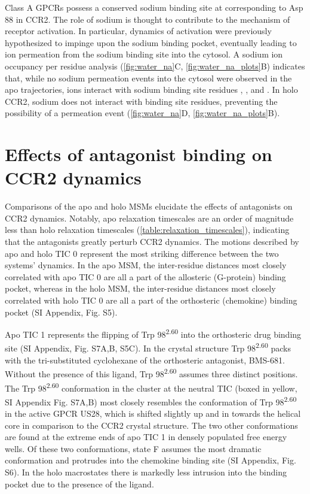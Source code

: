 Class A GPCRs possess a conserved sodium binding site at  corresponding to Asp 88 in CCR2\cite{Katritch2014}.
The role of sodium is thought to contribute to the mechanism of receptor activation\cite{Yuan2013,Vickery2018,Miao2015}. In particular, dynamics of activation were previously hypothesized to impinge upon the sodium binding pocket, eventually leading to ion permeation from the sodium binding site into the cytosol\cite{Vickery2018}.
A sodium ion occupancy per residue analysis (\ref{fig:water_na}C, \cref{fig:water_na_plots}B) indicates that, while no sodium permeation events into the cytosol were observed in the apo trajectories, ions interact with sodium binding site residues , , and .
In holo CCR2, sodium does not interact with binding site residues, preventing the possibility of a permeation event (\ref{fig:water_na}D, \cref{fig:water_na_plots}B).

\section{Effects of antagonist binding on CCR2 dynamics}

Comparisons of the apo and holo MSMs elucidate the effects of antagonists on CCR2 dynamics.
Notably, apo relaxation timescales are an order of magnitude less than holo relaxation timescales (\cref{table:relaxation_timescales}), indicating that the antagonists greatly perturb CCR2 dynamics.
The motions described by apo and holo TIC 0 represent the most striking difference between the two systems' dynamics.
In the apo MSM, the inter-residue distances most closely correlated with apo TIC 0 are all a part of the allosteric (G-protein) binding pocket, whereas in the holo MSM, the inter-residue distances most closely correlated with holo TIC 0 are all a part of the orthosteric (chemokine) binding pocket (SI Appendix, Fig. S5).

Apo TIC 1 represents the flipping of Trp 98\textsuperscript{2.60} into the orthosteric drug binding site (SI Appendix, Fig. S7A,B, S5C).
In the crystal structure Trp 98\textsuperscript{2.60} packs with the tri-substituted cyclohexane of the orthosteric antagonist, BMS-681\cite{Zheng2016}.
Without the presence of this ligand, Trp 98\textsuperscript{2.60} assumes three distinct positions.
The Trp 98\textsuperscript{2.60} conformation in the cluster at the neutral TIC (boxed in yellow, SI Appendix Fig. S7A,B) most closely resembles the conformation of Trp 98\textsuperscript{2.60} in the active GPCR US28, which is shifted slightly up and in towards the helical core in comparison to the CCR2 crystal structure.
The two other conformations are found at the extreme ends of apo TIC 1 in densely populated free energy wells.
Of these two conformations, state F assumes the most dramatic conformation and protrudes into the chemokine binding site (SI Appendix, Fig. S6).
In the holo macrostates there is markedly less intrusion into the binding pocket due to the presence of the ligand.

